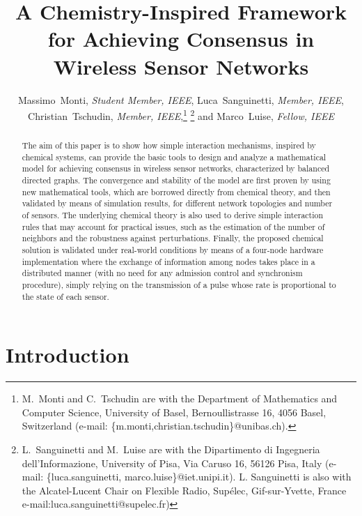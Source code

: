 \documentclass[journal]{IEEEtran}
\begin{document}
\title{\huge{A Chemistry-Inspired Framework for Achieving Consensus in Wireless Sensor Networks}}
\author{Massimo~Monti, \emph{Student Member, IEEE}, 
Luca~Sanguinetti, \emph{Member, IEEE},
Christian~Tschudin, \emph{Member, IEEE},\thanks{M.~Monti and C.~Tschudin are with the Department of Mathematics and Computer Science, University of Basel, Bernoullistrasse 16, 4056 Basel, Switzerland (e-mail:
\{m.monti,christian.tschudin\}@unibas.ch).} \thanks{L.~Sanguinetti and M.~Luise are with the Dipartimento di Ingegneria dell'Informazione, University of Pisa, Via Caruso 16, 56126 Pisa, Italy (e-mail:
\{luca.sanguinetti, marco.luise\}@iet.unipi.it). L. Sanguinetti is also with the Alcatel-Lucent Chair on Flexible Radio, Sup\'elec, Gif-sur-Yvette, France e-mail:luca.sanguinetti@supelec.fr)} 
and Marco~Luise, \emph{Fellow, IEEE}}
\maketitle

\begin{abstract} 
The aim of this paper is to show how simple interaction mechanisms, inspired by chemical systems, can provide the basic tools to design and analyze a mathematical model for achieving consensus in wireless sensor networks, characterized by balanced directed graphs. The convergence and stability of the model are first proven by using new mathematical tools, which are borrowed directly from chemical theory, and then validated by means of simulation results, for different network topologies and number of sensors. The underlying chemical theory is also used to derive simple interaction rules that may account for practical issues, such as the estimation of the number of neighbors and the robustness against perturbations. Finally, the proposed chemical solution is validated under real-world conditions by means of a four-node hardware implementation where the exchange of information among nodes takes place in a distributed manner (with no need for any admission control and synchronism procedure), simply relying on the transmission of a pulse whose rate is proportional to the state of each sensor.

\end{abstract}




\section{Introduction}
\end{document}
